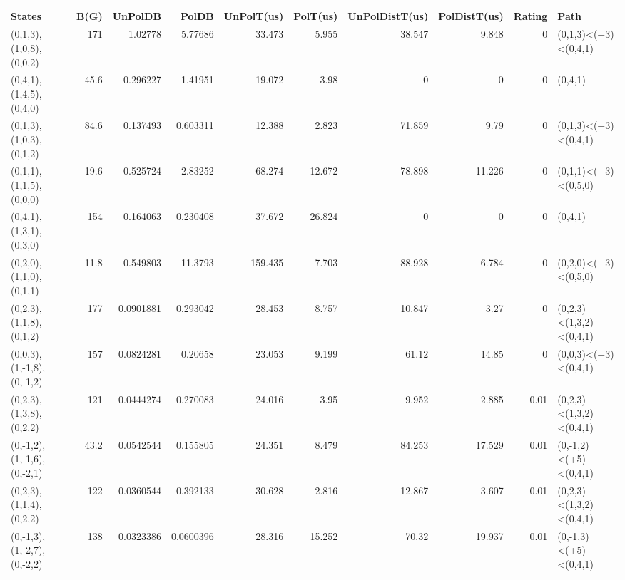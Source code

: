 \begin{tabular}{lrrrrrrrrl}
\hline
 States                     &   B(G) &   UnPolDB &      PolDB &   UnPolT(us) &   PolT(us) &   UnPolDistT(us) &   PolDistT(us) &   Rating & Path                    \\
\hline
 (0,1,3),(1,0,8),(0,0,2)    &  171   & 1.02778   &  5.77686   &       33.473 &      5.955 &           38.547 &          9.848 &     0    & (0,1,3)<(+3)<(0,4,1)    \\
 (0,4,1),(1,4,5),(0,4,0)    &   45.6 & 0.296227  &  1.41951   &       19.072 &      3.98  &            0     &          0     &     0    & (0,4,1)                 \\
 (0,1,3),(1,0,3),(0,1,2)    &   84.6 & 0.137493  &  0.603311  &       12.388 &      2.823 &           71.859 &          9.79  &     0    & (0,1,3)<(+3)<(0,4,1)    \\
 (0,1,1),(1,1,5),(0,0,0)    &   19.6 & 0.525724  &  2.83252   &       68.274 &     12.672 &           78.898 &         11.226 &     0    & (0,1,1)<(+3)<(0,5,0)    \\
 (0,4,1),(1,3,1),(0,3,0)    &  154   & 0.164063  &  0.230408  &       37.672 &     26.824 &            0     &          0     &     0    & (0,4,1)                 \\
 (0,2,0),(1,1,0),(0,1,1)    &   11.8 & 0.549803  & 11.3793    &      159.435 &      7.703 &           88.928 &          6.784 &     0    & (0,2,0)<(+3)<(0,5,0)    \\
 (0,2,3),(1,1,8),(0,1,2)    &  177   & 0.0901881 &  0.293042  &       28.453 &      8.757 &           10.847 &          3.27  &     0    & (0,2,3)<(1,3,2)<(0,4,1) \\
 (0,0,3),(1,-1,8),(0,-1,2)  &  157   & 0.0824281 &  0.20658   &       23.053 &      9.199 &           61.12  &         14.85  &     0    & (0,0,3)<(+3)<(0,4,1)    \\
 (0,2,3),(1,3,8),(0,2,2)    &  121   & 0.0444274 &  0.270083  &       24.016 &      3.95  &            9.952 &          2.885 &     0.01 & (0,2,3)<(1,3,2)<(0,4,1) \\
 (0,-1,2),(1,-1,6),(0,-2,1) &   43.2 & 0.0542544 &  0.155805  &       24.351 &      8.479 &           84.253 &         17.529 &     0.01 & (0,-1,2)<(+5)<(0,4,1)   \\
 (0,2,3),(1,1,4),(0,2,2)    &  122   & 0.0360544 &  0.392133  &       30.628 &      2.816 &           12.867 &          3.607 &     0.01 & (0,2,3)<(1,3,2)<(0,4,1) \\
 (0,-1,3),(1,-2,7),(0,-2,2) &  138   & 0.0323386 &  0.0600396 &       28.316 &     15.252 &           70.32  &         19.937 &     0.01 & (0,-1,3)<(+5)<(0,4,1)   \\

\end{tabular}

